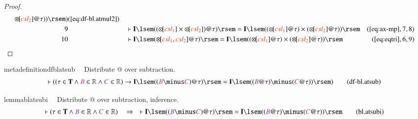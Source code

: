 \begin{proof}
\begin{align}
      {\otimes\hspace{-1pt}[} \msc{csl_2} ] @ \tau ) )
      \rsem )&(\mbox{\ref{eq:df-bl.atmul2}})\notag
  \\ 9 &&  & \vdash \mathbf{I} \lsem ( ( {\otimes\hspace{-1pt}[} \msc{csl_1} ]
      \times {\otimes\hspace{-1pt}[} \msc{csl_2} ] ) @ \tau
      ) \rsem = \mathbf{I} \lsem ( (
      {\otimes\hspace{-1pt}[} \msc{csl_1} ] @ \tau ) \times
      ( {\otimes\hspace{-1pt}[} \msc{csl_2} ] @ \tau ) )
      \rsem&(\mbox{\ref{eq:ax-mp}},7,8)\notag
  \\ 10 &&  & \vdash \mathbf{I} \lsem ( {\otimes\hspace{-1pt}[} \msc{csl_1} ,
      \msc{csl_2} ] @ \tau ) \rsem = \mathbf{I} \lsem ( (
      {\otimes\hspace{-1pt}[} \msc{csl_1} ] @ \tau ) \times
      ( {\otimes\hspace{-1pt}[} \msc{csl_2} ] @ \tau ) )
      \rsem&(\mbox{\ref{eq:eqtri}},6,9)\notag
\end{align}
\end{proof}

\begin{restatable}{metadefinition}{dfblatsub}~~ Distribute @ over subtraction.
\begin{align}
\vdash ( ( \tau \in \mathbf{T} \wedge \mc{B} \in \mathbb{R} \wedge \mc{C} \in
    \mathbb{R} ) \rightarrow \mathbf{I} \lsem ( ( \mc{B} \minus \mc{C} ) @ \tau
    ) \rsem = \mathbf{I} \lsem ( ( \mc{B} @ \tau ) \minus ( \mc{C} @ \tau ) )
    \rsem )\label{eq:df-bl.atsub}\tag{df-bl.atsub}
\end{align}
\end{restatable}

\begin{restatable}{lemma}{blatsubi}~~ Distribute @ over subtraction, inference.
\begin{align}
\vdash ( \tau \in \mathbf{T} \wedge \mc{B} \in \mathbb{R} \wedge \mc{C} \in
    \mathbb{R} )\quad\Rightarrow\quad \vdash \mathbf{I} \lsem ( ( \mc{B} \minus
    \mc{C} ) @ \tau ) \rsem = \mathbf{I} \lsem ( ( \mc{B} @ \tau ) \minus (
    \mc{C} @ \tau ) ) \rsem\label{eq:bl.atsubi}\tag{bl.atsubi}
\end{align}
\end{restatable}

